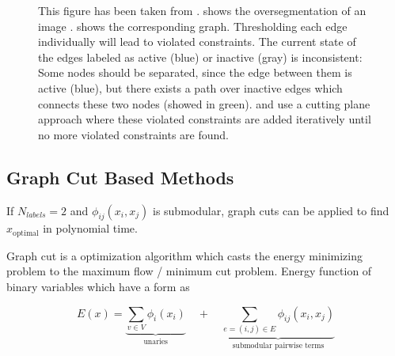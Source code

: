 \begin{figure}[h]
\centering
{}
\caption[Violated multicut constraints]{
This figure has been taken from \cite{andres_2011_iccv}.
 shows the oversegmentation of 
an image .
 shows the corresponding graph.
Thresholding each edge individually will lead to violated constraints.
The current state of the edges  labeled as active (blue) or inactive (gray) is
inconsistent: Some nodes should be separated, since the edge between them is
active (blue), but there exists a path over inactive edges 
which connects these two nodes (showed in green).
\citet{andres_2011_iccv} and \citet{kappes_2011_emmcvpr} use a
cutting plane approach where these violated constraints are added
iteratively until no more violated constraints are found.
} \label{fig:mc_ineq}
\end{figure}




\subsection{Graph Cut Based Methods}\label{sec:gcbased}

If $N_{labels}=2$ and $\phi_{ij}(x_i,x_j)$ is submodular, 
graph cuts \cite{boykov_2001_pami,kolmogorov_2004_pami} can be applied to find $x_{\text{optimal}}$
in polynomial time.

Graph cut is a optimization algorithm which casts the energy minimizing problem
to the maximum flow / minimum cut problem. Energy function of binary variables which
have a form as

\begin{equation} \label{eq:gm_graph_cut_energy}
    E(x) = 
    \underbrace{
        \sum_{v \in V} \phi_i(x_i)
    }_{\text{unaries}}
     \quad +  \quad
    \underbrace{
        \sum_{e=(i,j) \in E } \phi_{ij}(x_i,x_j) 
    }_{\text{submodular pairwise terms}}
\end{equation}



